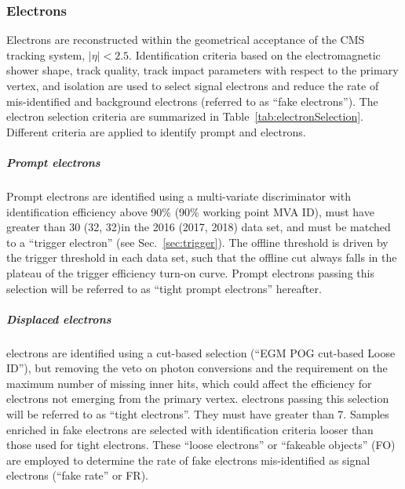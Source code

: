 \subsubsection{Electrons}\label{sec:llelectron}
Electrons are reconstructed within the geometrical acceptance of the
CMS tracking system, $|\eta|<2.5$.
Identification criteria based on the electromagnetic shower shape, track
quality, track impact parameters with respect to the primary vertex,
and isolation are used to select signal electrons and reduce the rate
of mis-identified and background electrons (referred to as ``fake
electrons'').
The electron selection criteria are summarized in
Table~\ref{tab:electronSelection}. 
Different criteria are applied to identify prompt and \displ
electrons.
\subparagraph {Prompt electrons}
Prompt electrons are identified using a multi-variate discriminator with identification efficiency above 90\%
(90\% working point MVA ID),
must have \pt greater than 30 (32, 32)\GeV in the 2016 (2017, 2018)
data set,
and must be matched to a ``trigger electron'' (see
Sec.~\ref{sec:trigger}).
The offline \pt threshold is driven by the trigger \pt threshold in
each data set, such that the offline cut always falls in the plateau
of the trigger efficiency turn-on curve.
Prompt electrons passing this selection will be referred to as ``tight
prompt electrons'' hereafter.
\subparagraph {Displaced electrons}
\Displ electrons are identified using a cut-based selection (``EGM
POG cut-based Loose ID''), but removing the veto
on photon conversions and the requirement on the maximum number of
missing inner hits, which could affect the efficiency for electrons
not emerging from the primary vertex.
\Displ electrons passing this selection will be referred to as
``tight \displ electrons''.
They must have \pt greater than 7\GeV.
Samples enriched in fake electrons are selected with
identification criteria looser than those used for tight \displ
electrons. These ``loose \displ electrons'' or ``fakeable objects''
(FO) are employed to determine the rate of fake electrons
mis-identified as signal electrons (``fake rate'' or FR).
